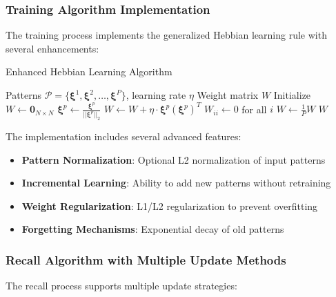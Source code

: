 \documentclass[11pt,a4paper]{article}
\begin{document}
\subsubsection{Training Algorithm Implementation}

The training process implements the generalized Hebbian learning rule with several enhancements:

\begin{algorithm}[H]
\caption{Enhanced Hebbian Learning Algorithm}
\begin{algorithmic}[1]
\REQUIRE Patterns $\mathcal{P} = \{\boldsymbol{\xi}^1, \boldsymbol{\xi}^2, \ldots, \boldsymbol{\xi}^P\}$, learning rate $\eta$
\ENSURE Weight matrix $W$
\STATE Initialize $W \leftarrow \mathbf{0}_{N \times N}$
        \STATE $\boldsymbol{\xi}^p \leftarrow \frac{\boldsymbol{\xi}^p}{||\boldsymbol{\xi}^p||_2}$ 
    \ENDIF
    \STATE $W \leftarrow W + \eta \cdot \boldsymbol{\xi}^p (\boldsymbol{\xi}^p)^T$ 
\ENDFOR
{}
    \STATE $W_{ii} \leftarrow 0$ for all $i$ 
\ENDIF
\STATE $W \leftarrow \frac{1}{P} W$ 
\RETURN $W$
\end{algorithmic}
\end{algorithm}

The implementation includes several advanced features:

\begin{itemize}
    \item \textbf{Pattern Normalization}: Optional L2 normalization of input patterns
    \item \textbf{Incremental Learning}: Ability to add new patterns without retraining
    \item \textbf{Weight Regularization}: L1/L2 regularization to prevent overfitting
    \item \textbf{Forgetting Mechanisms}: Exponential decay of old patterns
\end{itemize}

\subsubsection{Recall Algorithm with Multiple Update Methods}

The recall process supports multiple update strategies:
\end{document}
